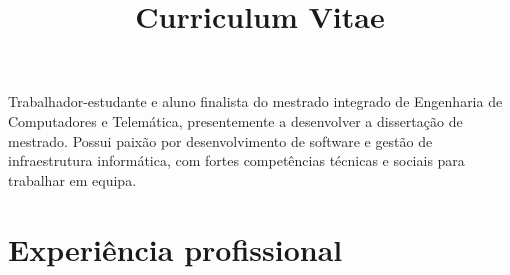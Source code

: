 \documentclass[11pt,a4paper,sans]{moderncv} %
\title{Curriculum Vitae}                               %
\begin{document}
\makecvtitle

\small{Trabalhador-estudante e aluno finalista do mestrado integrado de
  Engenharia de Computadores e Telemática, presentemente a desenvolver a
  dissertação de mestrado. Possui paixão por desenvolvimento de software e
  gestão de infraestrutura informática, com fortes competências técnicas
  e sociais para trabalhar em equipa.}

\section{Experiência profissional}

\vspace{6pt}
\end{document}
